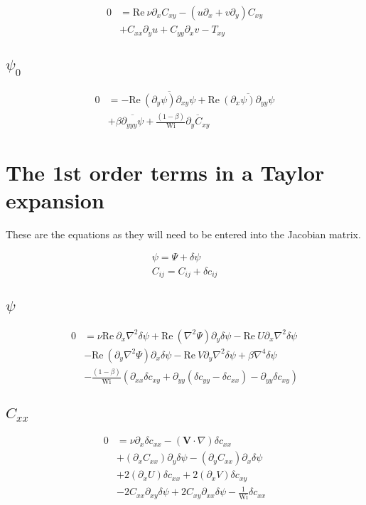 \documentclass[12,a4paper]{article}
\newcommand{\dd}[1]{\partial_{#1}}
\newcommand{\lpl}{\nabla^{2}}
\newcommand{\bih}{\nabla^{4}}
\newcommand{\scij}{\delta c_{ij}}
\newcommand{\scxx}{\delta c_{xx}}
\newcommand{\scyy}{\delta c_{yy}}
\newcommand{\scxy}{\delta c_{xy}}
\newcommand{\spsi}{\delta \psi}
\newcommand{\Wi}{\mathrm{Wi}}
\newcommand{\Rey}{\mathrm{Re \ }}
\begin{document}
\begin{align}
    0 &= \Rey \nu \dd{x} C_{xy} - (u\dd{x} + v\dd{y}) C_{xy} \nonumber\\
    &+ C_{xx} \dd{y}u + C_{yy}\dd{x}v - T_{xy}
\end{align}

\subsection{$\psi_{0}$}

\begin{align}
    0 &= - \Rey \overline{(\dd{y}\psi)\dd{xy}\psi} + \Rey \overline{(\dd{x}\psi)\dd{yy}\psi} \nonumber\\
    &+ \beta \overline{\dd{yyy}\psi} + \frac{(1-\beta)}{\Wi}\overline{\dd{y}C_{xy}}
\end{align}

\section{The 1st order terms in a Taylor expansion}

These are the equations as they will need to be entered into the Jacobian matrix.

\begin{align}
\psi = \Psi + \spsi \\
C_{ij} = C_{ij} +\scij
\end{align}

\subsection{$\psi$}

\begin{align}
    0 &= \nu\Rey\dd{x}\lpl\spsi +  \Rey (\lpl\Psi) \dd{y}\spsi - \Rey U \dd{x}\lpl \spsi \nonumber\\
    &- \Rey (\dd{y}\lpl \Psi) \dd{x} \spsi - \Rey V \dd{y} \lpl \spsi + \beta \bih \spsi \nonumber\\
    &- \frac{(1-\beta)}{\Wi} \left( \dd{xx} \scxy +\dd{yy} (\scyy -\scxx) - \dd{yy} \scxy \right)
\end{align}

\subsection{$C_{xx}$}

\begin{align}
    0 &= \nu \dd{x} \scxx - (\mathbf{V}\cdot \nabla) \scxx \nonumber \\
    &+ (\dd{x}C_{xx})\dd{y}\spsi - (\dd{y}C_{xx})\dd{x} \spsi \nonumber\\
    &+ 2(\dd{x} U) \scxx + 2(\dd{x} V) \scxy \nonumber\\
    &- 2C_{xx}\dd{xy} \spsi + 2C_{xy}\dd{xx}\spsi - \frac{1}{\Wi}\scxx
\end{align}
\end{document}
